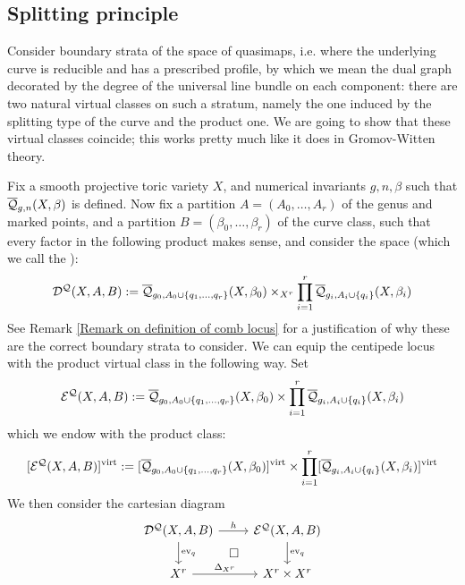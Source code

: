 \subsection{Splitting principle} \label{Subsection splitting}

Consider boundary strata of the space of quasimaps, i.e. where the underlying curve is reducible and has a prescribed profile, by which we mean the dual graph decorated by the degree of the universal line bundle on each component: there are two natural virtual classes on such a stratum, namely the one induced by the splitting type of the curve and the product one. We are going to show that these virtual classes coincide; this works pretty much like it does in Gromov-Witten theory.

Fix a smooth projective toric variety $X$, and numerical invariants $g,n,\beta$ such that $\overline{\mathcal Q}_{g,n}(X,\beta)$ is defined. Now fix a partition $A=(A_0,\ldots,A_r)$ of the genus and marked points, and a partition $B=(\beta_0, \ldots, \beta_r)$ of the curve class, such that every factor in the following product makes sense, and consider the space (which we call the ):
\begin{equation*} \mathcal{D^Q}(X,A,B) := \overline{\mathcal Q}_{g_0,A_0 \cup \{ q_1, \ldots, q_r \}}(X,\beta_0) \times_{X^r} \prod_{i=1}^r \overline{\mathcal Q}_{g_i,A_i\cup\{q_i\}}(X,\beta_i) \end{equation*}
See Remark \ref{Remark on definition of comb locus} for a justification of why these are the correct boundary strata to consider. We can equip the centipede locus with the product virtual class in the following way. Set
\begin{equation*} \mathcal{E^Q}(X,A,B) :=  \overline{\mathcal Q}_{g_0,A_0 \cup \{ q_1, \ldots, q_r \}}(X,\beta_0) \times \prod_{i=1}^r \overline{\mathcal Q}_{g_i,A_i\cup\{q_i\}}(X,\beta_i) \end{equation*}
which we endow with the product class:
\begin{equation*} [\mathcal{E^Q}(X,A,B)]^{\operatorname{virt}} := [\overline{\mathcal Q}_{g_0,A_0 \cup \{ q_1, \ldots, q_r \}}(X,\beta_0)]^{\operatorname{virt}} \times \prod_{i=1}^r [\overline{\mathcal Q}_{g_i,A_i\cup\{q_i\}}(X,\beta_i)]^{\operatorname{virt}} \end{equation*}
We then consider the cartesian diagram
\begin{equation} \label{Product diagram}
\begin{tikzcd}
\D{X}{A}{B} \ar[r,"h"] \ar[d,"\ev_q"] \ar[rd,phantom,"\square"] & \E{X}{A}{B} \ar[d,"\ev_q"] \\
X^r \ar[r,"\Delta_{X^r}"] & X^r \times X^r
\end{tikzcd}
\end{equation}
